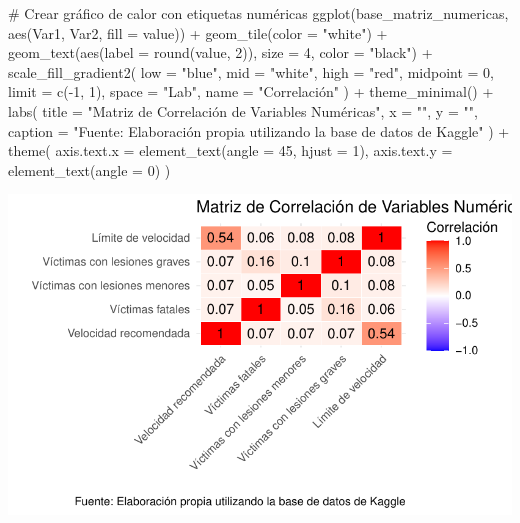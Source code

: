 \documentclass[
  letterpaper,
  DIV=11,
  numbers=noendperiod]{scrartcl}
\newenvironment{Shaded}{\begin{snugshade}}{\end{snugshade}}
\newcommand{\AttributeTok}[1]{\textcolor[rgb]{0.40,0.45,0.13}{#1}}
\newcommand{\CommentTok}[1]{\textcolor[rgb]{0.37,0.37,0.37}{#1}}
\newcommand{\DecValTok}[1]{\textcolor[rgb]{0.68,0.00,0.00}{#1}}
\newcommand{\FunctionTok}[1]{\textcolor[rgb]{0.28,0.35,0.67}{#1}}
\newcommand{\NormalTok}[1]{\textcolor[rgb]{0.00,0.23,0.31}{#1}}
\newcommand{\SpecialCharTok}[1]{\textcolor[rgb]{0.37,0.37,0.37}{#1}}
\newcommand{\StringTok}[1]{\textcolor[rgb]{0.13,0.47,0.30}{#1}}
\begin{document}
\begin{Shaded}
\begin{Highlighting}[]
\CommentTok{\# Crear gráfico de calor con etiquetas numéricas}
\FunctionTok{ggplot}\NormalTok{(base\_matriz\_numericas, }\FunctionTok{aes}\NormalTok{(Var1, Var2, }\AttributeTok{fill =}\NormalTok{ value)) }\SpecialCharTok{+}
  \FunctionTok{geom\_tile}\NormalTok{(}\AttributeTok{color =} \StringTok{"white"}\NormalTok{) }\SpecialCharTok{+}
  \FunctionTok{geom\_text}\NormalTok{(}\FunctionTok{aes}\NormalTok{(}\AttributeTok{label =} \FunctionTok{round}\NormalTok{(value, }\DecValTok{2}\NormalTok{)), }\AttributeTok{size =} \DecValTok{4}\NormalTok{, }\AttributeTok{color =} \StringTok{"black"}\NormalTok{) }\SpecialCharTok{+}
  \FunctionTok{scale\_fill\_gradient2}\NormalTok{(}
    \AttributeTok{low =} \StringTok{"blue"}\NormalTok{, }\AttributeTok{mid =} \StringTok{"white"}\NormalTok{, }\AttributeTok{high =} \StringTok{"red"}\NormalTok{,}
    \AttributeTok{midpoint =} \DecValTok{0}\NormalTok{, }\AttributeTok{limit =} \FunctionTok{c}\NormalTok{(}\SpecialCharTok{{-}}\DecValTok{1}\NormalTok{, }\DecValTok{1}\NormalTok{), }\AttributeTok{space =} \StringTok{"Lab"}\NormalTok{, }\AttributeTok{name =} \StringTok{"Correlación"}
\NormalTok{  ) }\SpecialCharTok{+}
  \FunctionTok{theme\_minimal}\NormalTok{() }\SpecialCharTok{+}
  \FunctionTok{labs}\NormalTok{(}
    \AttributeTok{title =} \StringTok{"Matriz de Correlación de Variables Numéricas"}\NormalTok{,}
    \AttributeTok{x =} \StringTok{""}\NormalTok{, }\AttributeTok{y =} \StringTok{""}\NormalTok{,}
    \AttributeTok{caption =} \StringTok{"Fuente: Elaboración propia utilizando la base de datos de Kaggle"}
\NormalTok{  ) }\SpecialCharTok{+}
  \FunctionTok{theme}\NormalTok{(}
    \AttributeTok{axis.text.x =} \FunctionTok{element\_text}\NormalTok{(}\AttributeTok{angle =} \DecValTok{45}\NormalTok{, }\AttributeTok{hjust =} \DecValTok{1}\NormalTok{),}
    \AttributeTok{axis.text.y =} \FunctionTok{element\_text}\NormalTok{(}\AttributeTok{angle =} \DecValTok{0}\NormalTok{)}
\NormalTok{  )}
\end{Highlighting}
\end{Shaded}

\includegraphics{cod_bitacora2_files/figure-pdf/unnamed-chunk-6-1.pdf}
\end{document}
